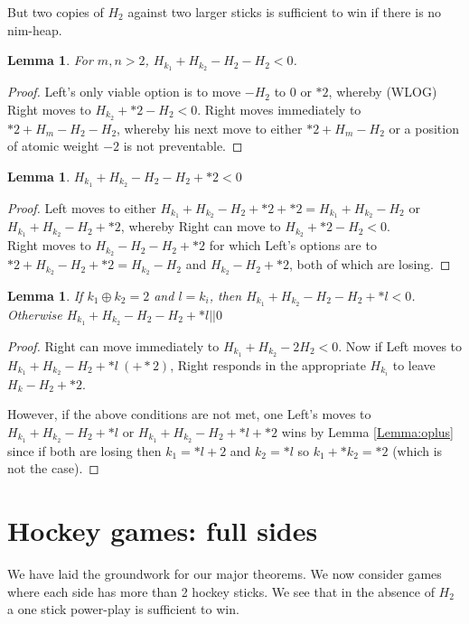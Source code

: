 \documentclass{amsart}
\newtheorem{lemma}[definition]{Lemma}
\begin{document}
But two copies of $H_2$ against two larger sticks is sufficient to win if there is no nim-heap.
\begin{lemma}
\label{Lemma:mn22}
For $m,n>2$, $H_{k_1}+H_{k_2}-H_2-H_2<0$.
\end{lemma}
\begin{proof}
Left's only viable option is to move $-H_2$ to 0 or $*2$, whereby (WLOG) Right moves to $H_{k_2}+*2-H_2<0$.  Right moves immediately to $*2+H_m-H_2-H_2$, whereby his next move to either $*2+H_m-H_2$ or a position of atomic weight $-2$ is not preventable.
\end{proof}

\begin{lemma}
\label{Lemma:mn22+2}
$H_{k_1}+H_{k_2}-H_2-H_2+*2<0$
\end{lemma}
\begin{proof}
Left moves to either $H_{k_1}+H_{k_2}-H_2+*2+*2=H_{k_1}+H_{k_2}-H_2$ or $H_{k_1}+H_{k_2}-H_2+*2$, whereby Right can move to $H_{k_2}+*2-H_2<0$.\\
Right moves to $H_{k_2}-H_2-H_2+*2$ for which Left's options are to $*2+H_{k_2}-H_2+*2=H_{k_2}-H_2$ and $H_{k_2}-H_2+*2$, both of which are losing.
\end{proof}

\begin{lemma}
\label{Lemma:mn22+*} If $k_1\oplus k_2=2$ and $l=k_i$, then $H_{k_1}+H_{k_2}-H_2-H_2+*l<0$.  Otherwise $H_{k_1}+H_{k_2}-H_2-H_2+*l||0$
\end{lemma}
\begin{proof}
Right can move immediately to $H_{k_1}+H_{k_2}-2H_2<0$.  Now if Left moves to $H_{k_1}+H_{k_2}-H_2+*l\ (+*2)$, Right responds in the appropriate $H_{k_i}$ to leave $H_k-H_2+*2$.
\par However, if the above conditions are not met, one Left's moves to $H_{k_1}+H_{k_2}-H_2+*l$ or $H_{k_1}+H_{k_2}-H_2+*l+*2$ wins by Lemma \ref{Lemma:oplus} since if both are losing then $k_1=*l+2$ and $k_2=*l$ so $k_1+*k_2=*2$ (which is not the case).
\end{proof}


\section{Hockey games: full sides}
We have laid the groundwork for our major theorems.  We now consider games where each side has more than 2 hockey sticks.  We see that in the absence of $H_2$ a one stick power-play is sufficient to win.
\end{document}
